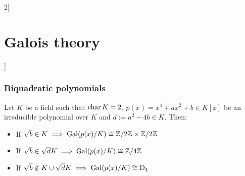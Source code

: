 \documentclass[../../../main_math.tex]{subfiles}
\begin{document}
\begin{multicols}{2}[\section{Galois theory}]
  \subsubsection{Biquadratic polynomials}
  \begin{theorem}
    Let $K$ be a field such that $\operatorname{char} K=2$, $p(x)=x^4+ax^2+b\in K[x]$ be an irreducible polynomial over $K$ and $d:=a^2-4b\in K$. Then:
    \begin{itemize}
      \item If $\sqrt{b}\in K\implies\Gal(p(x)/K)\cong\quot{\ZZ}{2\ZZ}\times\quot{\ZZ}{2\ZZ}$
      \item If $\sqrt{b}\in \sqrt{d}K\implies\Gal(p(x)/K)\cong\quot{\ZZ}{4\ZZ}$
      \item If $\sqrt{b}\notin K\cup\sqrt{d}K\implies\operatorname{Gal}(p(x)/K)\cong\text{D}_4$
    \end{itemize}
  \end{theorem}
\end{multicols}
\end{document}
